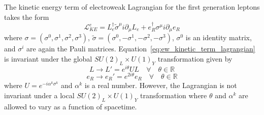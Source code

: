 The kinetic energy term of electroweak Lagrangian for the first generation leptons takes the form
\begin{equation}\label{eq:ew_kinetic_term_lagrangian}
	\mathcal{L}_{KE}^{e}=L_{e}^{\dagger}\tilde{\sigma}^{\mu}i\partial_{\mu}L_{e}+e_{R}^{\dagger}\sigma^{\mu}i\partial_{\mu}e_{R}
\end{equation}
where $\sigma=\left(\sigma^{0},\sigma^{1},\sigma^{2},\sigma^{3}\right)$, $\tilde{\sigma}=\left(\sigma^{0},-\sigma^{1},-\sigma^{2},-\sigma^{3}\right)$, $\sigma^{0}$ is an identity matrix, and $\sigma^{i}$ are again the Pauli matrices.
Equation~\ref{eq:ew_kinetic_term_lagrangian} is invariant under the global $SU\left(2\right)_{L}{\times}U\left(1\right)_{Y}$ transformation given by
\begin{equation}
	L{\rightarrow}L'=e^{i\theta}UL\hspace{1em}\forall\hspace{1em}\theta\in\mathbb{R}
\end{equation}
\begin{equation}
	e_{R}{\rightarrow}e_{R}'=e^{2i\theta}e_{R}\hspace{1em}\forall\hspace{1em}\theta\in\mathbb{R}
\end{equation}
where $U=e^{-i\alpha^{k}\sigma^{k}}$ and $\alpha^{k}$ is a real number.
However, the Lagrangian is not invariant under a local $SU\left(2\right)_{L}{\times}U\left(1\right)_{Y}$ transformation where $\theta$ and $\alpha^{k}$ are allowed to vary as a function of spacetime.

